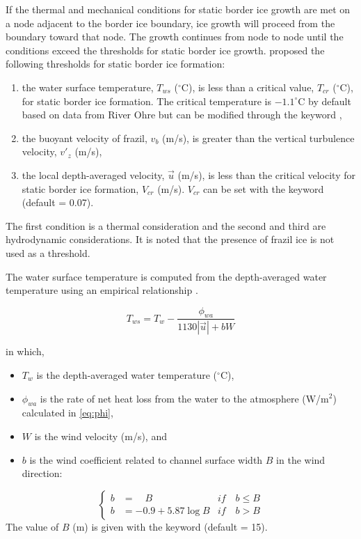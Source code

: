 If the thermal and mechanical conditions for static border ice growth are met on a node adjacent to the border ice boundary, ice growth will proceed from the boundary toward that node. The growth continues from node to node until the conditions exceed the thresholds for static border ice growth.
\cite{matousek1984types} proposed the following thresholds for static border ice formation:
\begin{enumerate}
  \item the water surface temperature, $T_{ws}$ ($^{\circ}$C), is less than a critical value, $T_{cr}$ ($^{\circ}$C), for static border ice formation. The critical temperature is $-1.1^{\circ}$C by default based on data from River Ohre but can be modified through the keyword ,
  \item the buoyant velocity of frazil, $v_b$ (m/s), is greater than the vertical turbulence velocity, $v'_z$ (m/s),
  \item the local depth-averaged velocity, $\vec{u}$ (m/s), is less than the critical velocity for static border ice formation, $V_{cr}$ (m/s). $V_{cr}$ can be set with the keyword  (default = 0.07).
\end{enumerate}

The first condition is a thermal consideration and the second and third are hydrodynamic considerations. It is noted that the presence of frazil ice is not used as a threshold.\newline

The water surface temperature is computed from the depth-averaged water temperature using an empirical relationship \cite{matousek1984types} \cite{matousek1984regularity}.

\begin{equation} \label{eq:surf_temp}
T_{ws} = T_w - \dfrac{\phi_{wa}}{1130 |\vec{u}|+bW}
\end{equation}

in which,
\begin{itemize}
    \item $T_w$ is the depth-averaged water temperature ($^{\circ}$C),
    \item $\phi_{wa}$ is the rate of net heat loss from the water to the atmosphere (W/m$^{2}$) calculated in \eqref{eq:phi},
    \item $W$ is the wind velocity (m/s), and
    \item $b$ is the wind coefficient related to channel surface width $B$ in the wind direction:
\end{itemize}
\begin{equation} \label{eq:wind_util_coeff}
  \left\{
  \begin{aligned}
  b &= \quad B\quad & if \quad b \leq B \\
  b &= -0.9+5.87 \log B & if \quad b > B
  \end{aligned}
\right.
\end{equation}
The value of $B$ (m) is given with the keyword  (default = 15).\newline

